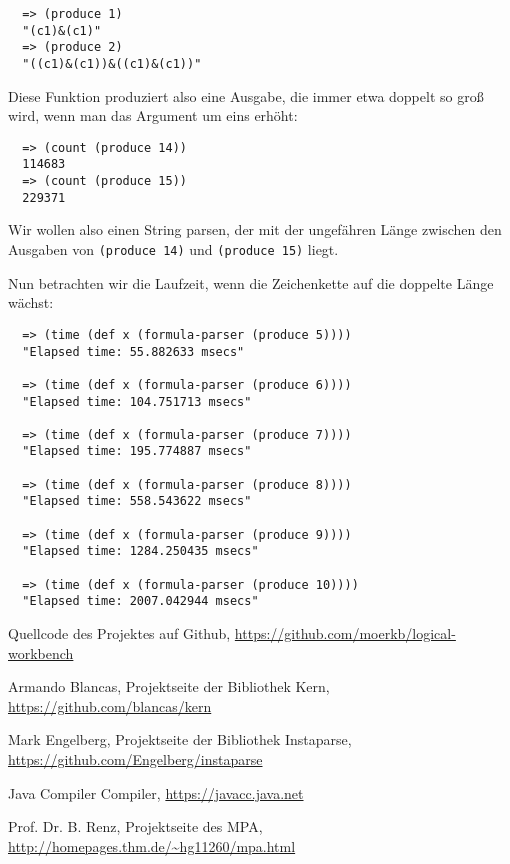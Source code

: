 \documentclass[ngerman,a4paper,abstracton,open=right,twoside=false,toc=listofnumbered,bibtotocnumbered]{scrreprt}
\begin{document}
\begin{lstlisting}
  => (produce 1)
  "(c1)&(c1)"
  => (produce 2)
  "((c1)&(c1))&((c1)&(c1))"
\end{lstlisting}

Diese Funktion produziert also eine Ausgabe, die immer etwa doppelt so groß wird, wenn man das Argument um eins erhöht:

\begin{lstlisting}
  => (count (produce 14))
  114683
  => (count (produce 15))
  229371
\end{lstlisting}

Wir wollen also einen String parsen, der mit der ungefähren Länge zwischen den Ausgaben von \lstinline|(produce 14)| und \lstinline|(produce 15)| liegt.

Nun betrachten wir die Laufzeit, wenn die Zeichenkette auf die doppelte Länge wächst:

\begin{lstlisting}
  => (time (def x (formula-parser (produce 5))))
  "Elapsed time: 55.882633 msecs"

  => (time (def x (formula-parser (produce 6))))
  "Elapsed time: 104.751713 msecs"

  => (time (def x (formula-parser (produce 7))))
  "Elapsed time: 195.774887 msecs"

  => (time (def x (formula-parser (produce 8))))
  "Elapsed time: 558.543622 msecs"

  => (time (def x (formula-parser (produce 9))))
  "Elapsed time: 1284.250435 msecs"

  => (time (def x (formula-parser (produce 10))))
  "Elapsed time: 2007.042944 msecs"
\end{lstlisting}


\appendix

\begin{thebibliography}{7}
		Quellcode des Projektes auf Github, 
		\url{https://github.com/moerkb/logical-workbench}

		Armando Blancas,
		Projektseite der Bibliothek Kern, 
		\url{https://github.com/blancas/kern}

		Mark Engelberg,
		Projektseite der Bibliothek Instaparse,
		\url{https://github.com/Engelberg/instaparse}

		Java Compiler Compiler,
		\url{https://javacc.java.net}

		Prof. Dr. B. Renz,
		Projektseite des MPA,
		\url{http://homepages.thm.de/~hg11260/mpa.html}
\end{thebibliography}
\end{document}
